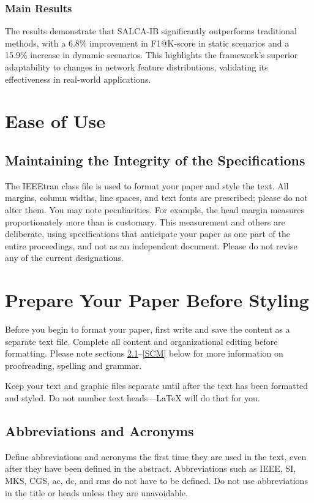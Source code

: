\documentclass[conference]{IEEEtran}
\begin{document}
\subsubsection{Main Results}
The results demonstrate that SALCA-IB significantly outperforms traditional methods, with a 6.8\% improvement in F1@K-score in static scenarios and a 15.9\% increase in dynamic scenarios. This highlights the framework's superior adaptability to changes in network feature distributions, validating its effectiveness in real-world applications.

\section{Ease of Use}

\subsection{Maintaining the Integrity of the Specifications}

The IEEEtran class file is used to format your paper and style the text. All margins, 
column widths, line spaces, and text fonts are prescribed; please do not 
alter them. You may note peculiarities. For example, the head margin
measures proportionately more than is customary. This measurement 
and others are deliberate, using specifications that anticipate your paper 
as one part of the entire proceedings, and not as an independent document. 
Please do not revise any of the current designations.

\section{Prepare Your Paper Before Styling}
Before you begin to format your paper, first write and save the content as a 
separate text file. Complete all content and organizational editing before 
formatting. Please note sections \ref{AA}--\ref{SCM} below for more information on 
proofreading, spelling and grammar.

Keep your text and graphic files separate until after the text has been 
formatted and styled. Do not number text heads---{\LaTeX} will do that 
for you.

\subsection{Abbreviations and Acronyms}\label{AA}
Define abbreviations and acronyms the first time they are used in the text, 
even after they have been defined in the abstract. Abbreviations such as 
IEEE, SI, MKS, CGS, ac, dc, and rms do not have to be defined. Do not use 
abbreviations in the title or heads unless they are unavoidable.
\end{document}
